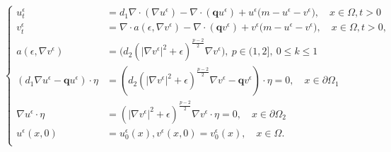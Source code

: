 \documentclass[10pt]{amsart}
\theoremstyle{plain}
\theoremstyle{definition}
\begin{document}
\begin{equation}
\label{eq:pde_modeld2}
\left\{ \begin{array}{ll}
u^{\epsilon}_t &= d_1 \nabla \cdot (\nabla u^{\epsilon}) - \nabla\cdot (\textbf{q}  u^{\epsilon}) +  u^{\epsilon}\Big(m-u^{\epsilon}-v^{\epsilon}\Big), \quad x\in \Omega, t>0\\
		v^{\epsilon}_t &= \nabla \cdot a(\epsilon,\nabla v^{\epsilon})  - \nabla\cdot (\textbf{q}  v^{\epsilon}) + v^{\epsilon}\Big(m-u^{\epsilon}-v^{\epsilon}\Big), \quad x\in\Omega,t>0, \\
	 a(\epsilon,\nabla v^{\epsilon}) & = \Big(  d_2   \left(|\nabla v^{\epsilon}|^{2}+{\epsilon}\right)^{\frac{p-2}{2}}  \nabla v^{\epsilon} \Big) , \ p \in (1,2], \ 0 \leq k \leq 1 \\
 (d_{1}\nabla u^{\epsilon} - \textbf{q} u^{\epsilon})  \cdot \eta &= (d_2  \left(|\nabla v^{\epsilon}|^{2}+{\epsilon}\right)^{\frac{p-2}{2}}  \nabla v^{\epsilon} - \textbf{q} v^{\epsilon})  \cdot \eta =0, \quad x\in \partial \Omega_{1} \\
 \nabla u^{\epsilon} \cdot \eta &= \left(|\nabla v^{\epsilon}|^{2}+{\epsilon}\right)^{\frac{p-2}{2}}\nabla v^{\epsilon} \cdot \eta=0, \quad x\in \partial \Omega_{2} \\
		u^{\epsilon}(x,0)&=u^{\epsilon}_0(x), v^{\epsilon}(x,0)=v^{\epsilon}_{0} (x), \quad x\in \Omega . \\
\end{array}\right.
\end{equation}



\end{document}
